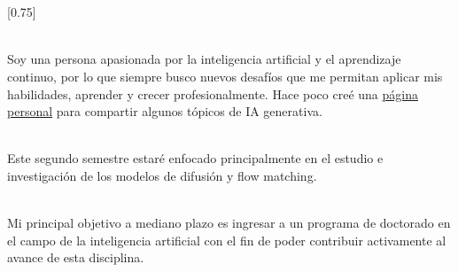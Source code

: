 \documentclass[lighthipster]{cvtheme}
\begin{document}
\thispagestyle{empty}
\section*{}


\subsection*{}
\vspace{4em}

\setlength{\columnsep}{1.5cm}
[0.75]

\begin{paracol}{2}

\paracolbackgroundoptions
\footnotesize
{\setasidefontcolour
\flushright
\vspace{1cm}
\begin{center}
\end{center}

\vspace{0.8cm}
\\[0.5em]
Soy una persona apasionada por la inteligencia artificial y el aprendizaje continuo, por lo que siempre busco nuevos desafíos que me permitan aplicar mis habilidades, aprender y crecer profesionalmente. Hace poco creé una \href{https://fernandofetis.notion.site}{página personal} para compartir algunos tópicos de IA generativa.

\vspace{0.8cm}
\\[0.5em]
Este segundo semestre estaré enfocado principalmente en el estudio e investigación de los modelos de difusión y flow matching.

\vspace{0.8cm}
 \\[0.5em]
Mi principal objetivo a mediano plazo es ingresar a un programa de doctorado en el campo de la inteligencia artificial con el fin de poder contribuir activamente al avance de esta disciplina.

\vfill
{}

}
\end{paracol}
\end{document}
